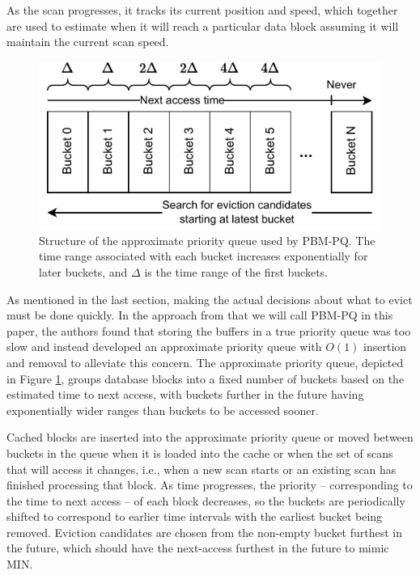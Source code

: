As the scan progresses, it tracks its current position and speed, which together are used to estimate when it will reach a particular data block assuming it will maintain the current scan speed.

\begin{figure}
    \centering
    \includegraphics[width=1\columnwidth]{figures/Diagrams/diagrams-approx-PQ.pdf}
    \caption{Structure of the approximate priority queue used by PBM-PQ. The time range associated with each bucket increases exponentially for later buckets, and $\Delta$ is the time range of the first buckets.}
    \label{fig:approx-pq}
\end{figure}

As mentioned in the last section, making the actual decisions about what to evict must be done quickly. In the approach from \cite{pbm} that we will call PBM-PQ in this paper, the authors found that storing the buffers in a true priority queue was too slow and instead developed an approximate priority queue with $O(1)$ insertion and removal to alleviate this concern. The approximate priority queue, depicted in Figure \ref{fig:approx-pq}, groups database blocks into a fixed number of buckets based on the estimated time to next access, with buckets further in the future having exponentially wider ranges than buckets to be accessed sooner.

Cached blocks are inserted into the approximate priority queue or moved between buckets in the queue when it is loaded into the cache or when the set of scans that will access it changes, i.e., when a new scan starts or an existing scan has finished processing that block. As time progresses, the priority -- corresponding to the time to next access -- of each block decreases, so the buckets are periodically shifted to correspond to earlier time intervals with the earliest bucket being removed. Eviction candidates are chosen from the non-empty bucket furthest in the future, which should have the next-access furthest in the future to mimic MIN.